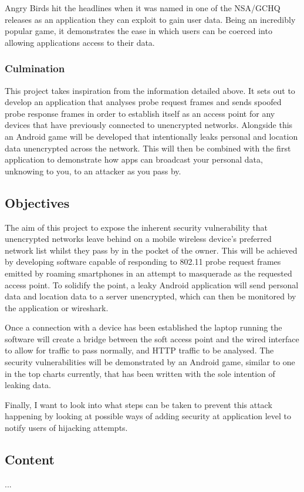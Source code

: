 Angry Birds hit the headlines when it was named in one of the NSA/GCHQ releases as an application they can exploit to gain user data. Being an incredibly popular game, it demonstrates the ease in which users can be coerced into allowing applications access to their data.
\newpage
\subsubsection{Culmination}

This project takes inspiration from the information detailed above. It sets out to develop an application that analyses probe request frames and sends spoofed probe response frames in order to establish itself as an access point for any devices that have previously connected to unencrypted networks. Alongside this an Android game will be developed that intentionally leaks personal and location data unencrypted across the network. This will then be combined with the first application to demonstrate how apps can broadcast your personal data, unknowing to you, to an attacker as you pass by.

\subsection{Objectives}
The aim of this project to expose the inherent security vulnerability that unencrypted networks leave behind on a mobile wireless device's preferred network list whilst they pass by in the pocket of the owner. This will be achieved by developing software capable of responding to 802.11 probe request frames emitted by roaming smartphones in an attempt to masquerade as the requested access point. To solidify the point, a leaky Android application will send personal data and location data to a server unencrypted, which can then be monitored by the application or wireshark.

Once a connection with a device has been established the laptop running the software will create a bridge between the soft access point and the wired interface to allow for traffic to pass normally, and HTTP traffic to be analysed. The security vulnerabilities will be demonstrated by an Android game, similar to one in the top charts currently, that has been written with the sole intention of leaking data. 

Finally, I want to look into what steps can be taken to prevent this attack happening by looking at possible ways of adding security at application level to notify users of hijacking attempts.

\subsection{Content}
...
\clearpage